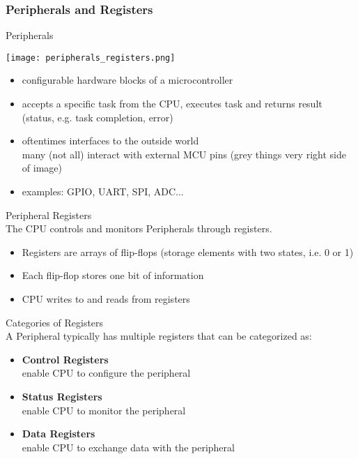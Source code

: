 \subsubsection{Peripherals and Registers}


\begin{definition}{Peripherals}

    \begin{minipage}{0.55\linewidth}
    \texttt{[image: peripherals\_registers.png]}
    \end{minipage}
    \begin{minipage}{0.44\linewidth}
    \begin{itemize}
        \item configurable hardware blocks of a microcontroller
        \item accepts a specific task from the CPU, executes task and returns result (status, e.g. task completion, error)
        \item oftentimes interfaces to the outside world\\
        many (not all) interact with external MCU pins (grey things very right side of image)
        \item examples: GPIO, UART, SPI, ADC...
    \end{itemize}
    \end{minipage}
\end{definition}


\begin{definition}{Peripheral Registers}\\
    The CPU controls and monitors Peripherals through registers.
    \begin{itemize}
        \item Registers are arrays of flip-flops (storage elements with two states, i.e. 0 or 1)
        \item Each flip-flop stores one bit of information
        \item CPU writes to and reads from registers
    \end{itemize}
\end{definition}

\begin{theorem}{Categories of Registers}\\
    A Peripheral typically has multiple registers that can be categorized as:
    \vspace{-2mm}\\
    \begin{itemize}
        \item \textbf{Control Registers} \\
        enable CPU to configure the peripheral
        \item \textbf{Status Registers} \\
        enable CPU to monitor the peripheral
        \item \textbf{Data Registers} \\
        enable CPU to exchange data with the peripheral
    \end{itemize}
\end{theorem}

